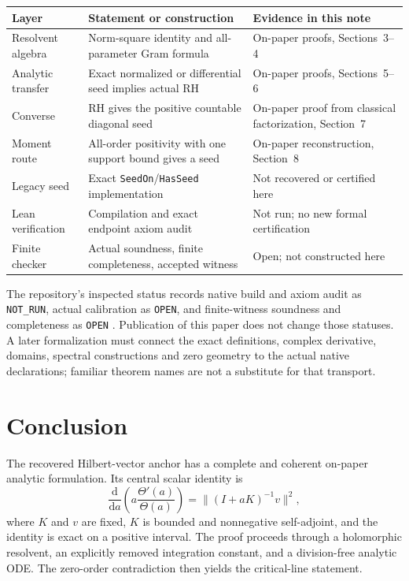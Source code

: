 \documentclass[11pt,a4paper]{article}
\numberwithin{equation}{section}
\theoremstyle{definition}
\theoremstyle{remark}
\newcommand{\norm}[1]{\lVert #1\rVert}
\begin{document}
\begin{longtable}{@{}>{\raggedright\arraybackslash}p{}>{\raggedright\arraybackslash}p{}>{\raggedright\arraybackslash}p{}@{}}
\toprule
\textbf{Layer}&\textbf{Statement or construction}&\textbf{Evidence in this note}\\
\midrule
\endhead
Resolvent algebra&Norm-square identity and all-parameter Gram formula&On-paper proofs, Sections~3--4\\
\addlinespace
Analytic transfer&Exact normalized or differential seed implies actual RH&On-paper proofs, Sections~5--6\\
\addlinespace
Converse&RH gives the positive countable diagonal seed&On-paper proof from classical factorization, Section~7\\
\addlinespace
Moment route&All-order positivity with one support bound gives a seed&On-paper reconstruction, Section~8\\
\addlinespace
Legacy seed&Exact \texttt{SeedOn}/\texttt{HasSeed} implementation&Not recovered or certified here\\
\addlinespace
Lean verification&Compilation and exact endpoint axiom audit&Not run; no new formal certification\\
\addlinespace
Finite checker&Actual soundness, finite completeness, accepted witness&Open; not constructed here\\
\bottomrule
\end{longtable}

The repository's inspected status records native build and axiom audit
as \texttt{NOT\_RUN}, actual calibration as \texttt{OPEN}, and
finite-witness soundness and completeness as \texttt{OPEN}
\cite{repo-status}. Publication of this paper does not change those
statuses. A later formalization must connect the exact definitions,
complex derivative, domains, spectral constructions and zero geometry
to the actual native declarations; familiar theorem names are not a
substitute for that transport.

\section{Conclusion}\label{sec:conclusion}

The recovered Hilbert-vector anchor has a complete and coherent
on-paper analytic formulation. Its central scalar identity is
\[
\frac{\mathrm d}{\mathrm da}\left(a\frac{\Theta'(a)}{\Theta(a)}\right)
=\norm{(I+aK)^{-1}v}^2,
\]
where $K$ and $v$ are fixed, $K$ is bounded and nonnegative
self-adjoint, and the identity is exact on a positive interval.
The proof proceeds through a holomorphic resolvent, an explicitly
removed integration constant, and a division-free analytic ODE.
The zero-order contradiction then yields the critical-line statement.
\end{document}
